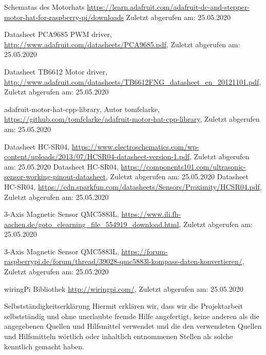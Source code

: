 \documentclass[12pt]{report}
\begin{document}
\begin{thebibliography}{9}

  Schematas des Motorhats
  \url{https://learn.adafruit.com/adafruit-dc-and-stepper-motor-hat-for-raspberry-pi/downloads}
  Zuletzt abgerufen am: 25.05.2020

  Datasheet PCA9685 PWM driver,
  \url{http://www.adafruit.com/datasheets/PCA9685.pdf},
  Zuletzt abgerufen am: 25.05.2020

  Datasheet TB6612 Motor driver,
  \url{http://www.adafruit.com/datasheets/TB6612FNG_datasheet_en_20121101.pdf},
  Zuletzt abgerufen am: 25.05.2020

  adafruit-motor-hat-cpp-library,
  Autor tomfclarke,
  \url{https://github.com/tomfclarke/adafruit-motor-hat-cpp-library},
  Zuletzt abgerufen am: 25.05.2020


  Datasheet HC-SR04,
  \url{https://www.electroschematics.com/wp-content/uploads/2013/07/HCSR04-datasheet-version-1.pdf},
  Zuletzt abgerufen am: 25.05.2020
  Datasheet HC-SR04,
  \url{https://components101.com/ultrasonic-sensor-working-pinout-datasheet},
  Zuletzt abgerufen am: 25.05.2020
  Datasheet HC-SR04,
  \url{https://cdn.sparkfun.com/datasheets/Sensors/Proximity/HCSR04.pdf},
  Zuletzt abgerufen am: 25.05.2020

  3-Axis Magnetic Sensor QMC5883L,
  \url{https://www.ili.fh-aachen.de/goto_elearning_file_554919_download.html},
  Zuletzt abgerufen am: 25.05.2020

  3-Axis Magnetic Sensor QMC5883L,
  \url{https://forum-raspberrypi.de/forum/thread/39028-qmc5883l-kompass-daten-konvertieren/},
  Zuletzt abgerufen am: 25.05.2020

  wiringPi Bibliothek
  \url{http://wiringpi.com/},
  Zuletzt abgerufen am: 25.05.2020


\end{thebibliography}


\pagebreak
\begin{section}{Selbstständigkeitserklärung}
  Hiermit erklären wir, dass wir die Projektarbeit selbstständig und ohne
  unerlaubte fremde Hilfe angefertigt, keine anderen als die
  angegebenen Quellen und Hilfsmittel verwendet und die den verwendeten Quellen
  und Hilfsmitteln wörtlich oder inhaltlich entnommenen Stellen als solche kenntlich
  gemacht haben.
\end{section}
\end{document}
